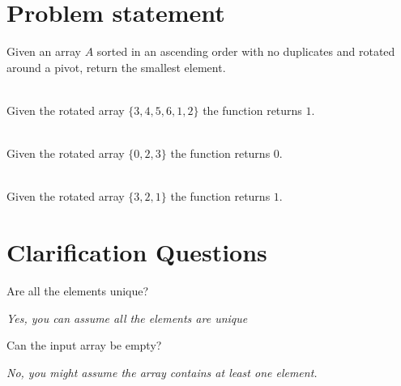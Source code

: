 \section{Problem statement}
\begin{exercise}
Given an array $A$ sorted in an ascending order with no duplicates and rotated around a pivot, return the smallest element.

	\begin{example}
		\hfill \\
		Given the rotated array $\{3,4,5,6,1,2\}$ the function returns $1$.
	\end{example}

	\begin{example}
		\hfill \\
		Given the rotated array $\{0,2,3\}$ the function returns $0$.
	\end{example}

	\begin{example}
		\hfill \\
		Given the rotated array $\{3,2,1\}$ the function returns $1$.
	\end{example}
\end{exercise}

\section{Clarification Questions}

\begin{QandA}
	\item \begin{questionitem} \begin{question} Are all the elements unique?   \end{question} 	 
    \begin{answered}
		\textit{Yes, you can assume all the elements are unique}
	\end{answered} \end{questionitem}
	\item \begin{questionitem} \begin{question} Can the input array be empty?  \end{question} 	 
    \begin{answered}
		\textit{No, you might assume the array contains at least one element.}
	\end{answered} \end{questionitem}
\end{QandA}

